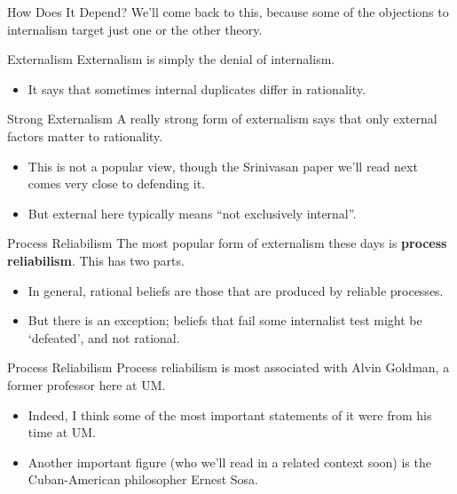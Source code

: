 \documentclass[
  17pt,
  letterpaper,
  ignorenonframetext,
  aspectratio=169,
]{beamer}
\providecommand{\tightlist}{%
  \setlength{\itemsep}{0pt}\setlength{\parskip}{0pt}}\usepackage{longtable,booktabs,array}
\begin{document}
\begin{frame}{How Does It Depend?}
\protect\hypertarget{how-does-it-depend-1}{}
We'll come back to this, because some of the objections to internalism
target just one or the other theory.
\end{frame}

\begin{frame}{Externalism}
\protect\hypertarget{externalism}{}
Externalism is simply the denial of internalism.

\begin{itemize}[<+->]
\tightlist
\item
  It says that sometimes internal duplicates differ in rationality.
\end{itemize}
\end{frame}

\begin{frame}{Strong Externalism}
\protect\hypertarget{strong-externalism}{}
A really strong form of externalism says that only external factors
matter to rationality.

\begin{itemize}[<+->]
\tightlist
\item
  This is not a popular view, though the Srinivasan paper we'll read
  next comes very close to defending it.
\item
  But external here typically means ``not exclusively internal''.
\end{itemize}
\end{frame}

\begin{frame}{Process Reliabilism}
\protect\hypertarget{process-reliabilism}{}
The most popular form of externalism these days is \textbf{process
reliabilism}. This has two parts.

\begin{itemize}[<+->]
\tightlist
\item
  In general, rational beliefs are those that are produced by reliable
  processes.
\item
  But there is an exception; beliefs that fail some internalist test
  might be `defeated', and not rational.
\end{itemize}
\end{frame}

\begin{frame}{Process Reliabilism}
\protect\hypertarget{process-reliabilism-1}{}
Process reliabilism is most associated with Alvin Goldman, a former
professor here at UM.

\begin{itemize}[<+->]
\tightlist
\item
  Indeed, I think some of the most important statements of it were from
  his time at UM.
\item
  Another important figure (who we'll read in a related context soon) is
  the Cuban-American philosopher Ernest Sosa.
\end{itemize}
\end{frame}
\end{document}

